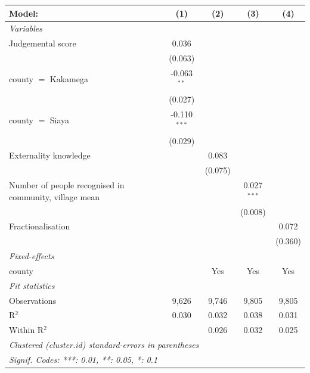 
\begingroup
\centering
\begin{tabular}{lcccc}
   \tabularnewline \midrule \midrule
   Model:                                                 & (1)            & (2)     & (3)           & (4)\\  
   \midrule
   \emph{Variables}\\
   Judgemental score                                      & 0.036          &         &               &   \\   
                                                          & (0.063)        &         &               &   \\   
   county $=$ Kakamega                                    & -0.063$^{**}$  &         &               &   \\   
                                                          & (0.027)        &         &               &   \\   
   county $=$ Siaya                                       & -0.110$^{***}$ &         &               &   \\   
                                                          & (0.029)        &         &               &   \\   
   Externality knowledge                                  &                & 0.083   &               &   \\   
                                                          &                & (0.075) &               &   \\   
   Number of people recognised in community, village mean &                &         & 0.027$^{***}$ &   \\   
                                                          &                &         & (0.008)       &   \\   
   Fractionalisation                                      &                &         &               & 0.072\\   
                                                          &                &         &               & (0.360)\\   
   \midrule
   \emph{Fixed-effects}\\
   county                                                 &                & Yes     & Yes           & Yes\\  
   \midrule
   \emph{Fit statistics}\\
   Observations                                           & 9,626          & 9,746   & 9,805         & 9,805\\  
   R$^2$                                                  & 0.030          & 0.032   & 0.038         & 0.031\\  
   Within R$^2$                                           &                & 0.026   & 0.032         & 0.025\\  
   \midrule \midrule
   \multicolumn{5}{l}{\emph{Clustered (cluster.id) standard-errors in parentheses}}\\
   \multicolumn{5}{l}{\emph{Signif. Codes: ***: 0.01, **: 0.05, *: 0.1}}\\
\end{tabular}
\par\endgroup


